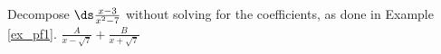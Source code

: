 {Decompose $\ds \frac{x-3}{x^2-7}$ without solving for the coefficients, as done in Example \ref{ex_pf1}.}
{$\frac{A}{x-\sqrt{7}} + \frac{B}{x+\sqrt{7}}$}
